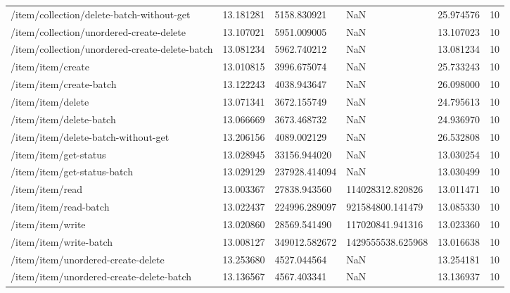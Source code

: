 \begin{tabularx}{\linewidth}{XXXXXX}
/item/collection/delete-batch-without-get & 13.181281 & 5158.830921 & NaN & 25.974576 & 10 \\
/item/collection/unordered-create-delete & 13.107021 & 5951.009005 & NaN & 13.107023 & 10 \\
/item/collection/unordered-create-delete-batch & 13.081234 & 5962.740212 & NaN & 13.081234 & 10 \\
/item/item/create & 13.010815 & 3996.675074 & NaN & 25.733243 & 10 \\
/item/item/create-batch & 13.122243 & 4038.943647 & NaN & 26.098000 & 10 \\
/item/item/delete & 13.071341 & 3672.155749 & NaN & 24.795613 & 10 \\
/item/item/delete-batch & 13.066669 & 3673.468732 & NaN & 24.936970 & 10 \\
/item/item/delete-batch-without-get & 13.206156 & 4089.002129 & NaN & 26.532808 & 10 \\
/item/item/get-status & 13.028945 & 33156.944020 & NaN & 13.030254 & 10 \\
/item/item/get-status-batch & 13.029129 & 237928.414094 & NaN & 13.030499 & 10 \\
/item/item/read & 13.003367 & 27838.943560 & 114028312.820826 & 13.011471 & 10 \\
/item/item/read-batch & 13.022437 & 224996.289097 & 921584800.141479 & 13.085330 & 10 \\
/item/item/write & 13.020860 & 28569.541490 & 117020841.941316 & 13.023360 & 10 \\
/item/item/write-batch & 13.008127 & 349012.582672 & 1429555538.625968 & 13.016638 & 10 \\
/item/item/unordered-create-delete & 13.253680 & 4527.044564 & NaN & 13.254181 & 10 \\
/item/item/unordered-create-delete-batch & 13.136567 & 4567.403341 & NaN & 13.136937 & 10
\end{tabularx}
